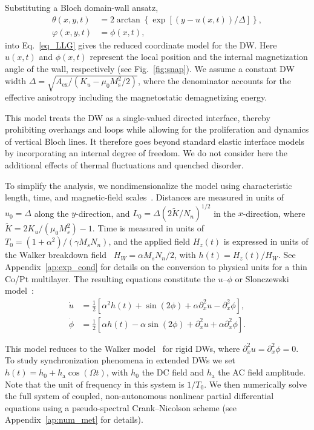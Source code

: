 \documentclass[prb,aps,twocolumn,superscriptaddress,floatfix]{revtex4-2}
\begin{document}
Substituting a Bloch domain-wall ansatz,
\begin{align}
    \theta(x, y, t) &= 2 \arctan\left\{ \exp[{(y - u(x, t))}/{\Delta}] \right\},     \label{eq:Bloch1} \\
    \label{eq:Bloch2}
    \varphi(x, y, t) &= \phi(x, t), 
\end{align}
into Eq.~\eqref{eq_LLG} gives the reduced coordinate model for the DW. Here $u(x, t)$ and $\phi(x, t)$ represent the local position and the internal magnetization angle of the wall, respectively (see Fig.~\ref{fig:snap}). We assume a constant DW width $\Delta = \sqrt{A_\text{ex}/\left(K_u - \mu_0 M_\text{s}^2/2\right)}$, where the denominator accounts for the effective anisotropy including the magnetostatic demagnetizing energy. 

This model treats the DW as a single-valued directed interface, thereby prohibiting overhangs and loops while allowing for the proliferation and dynamics of vertical Bloch lines. It therefore goes beyond standard elastic interface models by incorporating an internal degree of freedom. We do not consider here the additional effects of thermal fluctuations and quenched disorder.

To simplify the analysis, we nondimensionalize the model using characteristic length, time, and magnetic-field scales~\cite{pusiol2026deterministic}. Distances are measured in units of $u_0 = \Delta$ along the $y$-direction, and $L_0 = \Delta ({2\tilde{K}/N_n})^{1/2}$ in the $x$-direction, where $\tilde{K} = 2 K_u / (\mu_0 M_{s}^2) - 1$. Time is measured in units of $T_0 =(1+\alpha^{2})/(\gamma M_s N_n)$, and the applied field $H_{z}(t)$ is expressed in units of the Walker breakdown field~\cite{skaugen2019} $H_W = \alpha M_s N_n / 2$, with $h(t)=H_{z}(t)/H_{W}$. See Appendix~\ref{ap:exp_cond} for details on the conversion to physical units for a thin Co/Pt multilayer. The resulting equations constitute the $u$--$\phi$ or Slonczewski model~\cite{Slonczewski1972}:
\begin{align}
\dot{u} &= \frac{1}{2} \left[ \alpha^2 h(t) + \sin(2\phi) + \alpha \partial_x^2 u - \partial_x^2 \phi \right], \nonumber \\
\dot{\phi} &= \frac{1}{2} \left[ \alpha h(t) - \alpha \sin(2\phi) + \partial_x^2 u + \alpha \partial_x^2 \phi \right].
\label{eq:uphi}
\end{align}

This model reduces to the Walker model~\cite{Schryer1974} for rigid DWs, where $\partial ^2_xu=\partial^2_x\phi=0$. To study synchronization phenomena in extended DWs we set $h(t)=h_\text{0}+h_\text{a}\cos\left(\Omega t\right)$, with $h_{0}$ the DC field and $h_{\text{a}}$ the AC field amplitude. Note that the unit of frequency in this system is $1/T_0$. We then numerically solve the full system of coupled, non-autonomous nonlinear partial differential equations using a pseudo-spectral Crank--Nicolson scheme (see Appendix~\ref{ap:num_met} for details).
\end{document}
